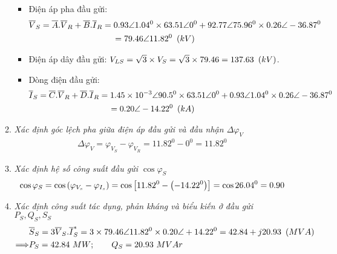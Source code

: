\begin{enumerate}
\begin{enumerate}[\it a.]
\begin{itemize}
						\item Điện áp pha đầu gửi:
							\begin{align*}
								\overline{V}_S & = \overline{A}. \overline{V}_R + \overline{B}.\overline{I}_R = 0.93 \angle 1.04^0 \times 63.51 \angle 0^0+ 92.77 \angle 75.96^0 \times 0.26 \angle -36.87^0 \\
								& \hspace{3cm}= 79.46 \angle 11.82^0 \unitp{kV}
							\end{align*}
							
						\item Điện áp dây đầu gửi: $V_{LS} = \sqrt{3} \times V_S = \sqrt{3} \times 79.46 = 137.63 ~\left({kV}\right)$.
						\item Dòng điện đầu gửi:
							\begin{align*}						
								\overline{I}_S & = \overline{C}. \overline{V}_R + \overline{D}.\overline{I}_R= 1.45 \times 10^{-3} \angle 90.5^0 \times 63.51 \angle 0^0 + 0.93 \angle 1.04^0 \times 0.26 \angle -36.87^0 \\ 
								&\hspace{3cm} = 0.20 \angle -14.22^0 \unitp{kA}
							\end{align*}
					\end{itemize}					
				
				\item \emph{Xác định góc lệch pha giữa điện áp đầu gửi và đầu nhận $\Delta \varphi_V$}
						\begin{align*}
							\Delta \varphi_V = \varphi_{V_S} - \varphi_{V_R} = 11.82^0 - 0^0= 11.82^0
						\end{align*}
					
				\item \emph{Xác định hệ số công suất đầu gửi $\cos \varphi_S$}
					\begin{align*}
						\cos \varphi_S  = \cos \left({\varphi_{V_s} - \varphi_{I_{s}}}\right)= \cos \left[{11.82^0 - \left({-14.22^0}\right)} \right] = \cos 26.04^0 = 0.90
					\end{align*}					
				
				\item \emph{Xác định công suất tác dụng, phản kháng và biểu kiến ở đầu gửi $P_S, Q_S, S_S$}
					\begin{align*}
						& \overline{S}_S  = 3 \overline{V}_S.\overline{I}_S^{\ast} = 3 \times 79.46 \angle 11.82^0 \times 0.20 \angle +14.22^0 =  42.84+ j20.93 ~\left({MVA}\right)\\
						\Longrightarrow & P_S  = 42.84 ~MW; \qquad Q_S = 20.93 ~MVAr
					\end{align*}						
			

\end{enumerate}
\end{enumerate}
